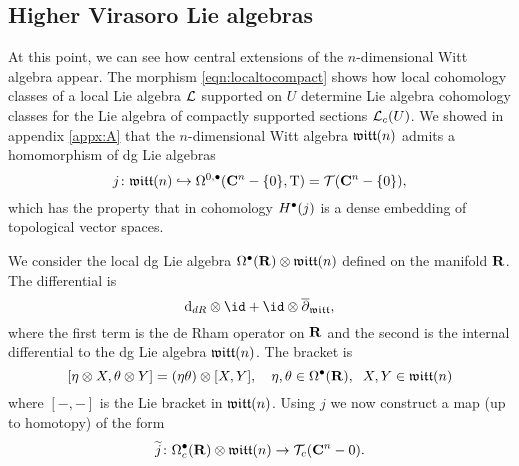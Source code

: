 \documentclass[11pt]{amsart}
\begin{document}
\subsection{Higher Virasoro Lie algebras}

At this point, we can see how central extensions of the $n$-dimensional Witt algebra appear.
The morphism \eqref{eqn:localtocompact} shows how local cohomology classes of a local Lie algebra $\mathcal L$ supported on $U$ determine Lie algebra cohomology classes for the Lie algebra of compactly supported sections $\mathcal L_c(U)$.
We showed in appendix \ref{appx:A} that the $n$-dimensional Witt algebra $\mathfrak{witt}(n)$ admits a homomorphism of dg Lie algebras
\begin{equation}
j \colon \mathfrak{witt}(n) \hookrightarrow \Omega^{0,\bullet} (\mathbf{C}^n - \{0\}, {\rm T}) = \mathcal T(\mathbf{C}^n - \{0\}),
\end{equation}
which has the property that in cohomology $H^\bullet(j)$ is a dense embedding of topological vector spaces.

We consider the local dg Lie algebra $\Omega^\bullet(\mathbf{R}) \otimes \mathfrak{witt}(n)$ defined on the manifold $\mathbf{R}$.
The differential is 
\begin{equation}
\d_{dR} \otimes \id + \id \otimes \dbar_{\lie{witt}},
\end{equation}
where the first term is the de Rham operator on $\mathbf{R}$ and the second is the internal differential to the dg Lie algebra $\mathfrak{witt}(n)$.
The bracket is
\begin{equation}\label{eqn:tensorbracket}
[\eta \otimes X, \theta \otimes Y] = (\eta \theta) \otimes [X,Y] , \quad \eta,\theta \in \Omega^\bullet(\mathbf{R}), \;\; X,Y \in \mathfrak{witt}(n)
\end{equation}
where $[-,-]$ is the Lie bracket in $\mathfrak{witt}(n)$.
Using $j$ we now construct a map (up to homotopy) of the form
\begin{equation}\label{eqn:tilj}
\widetilde j \colon \Omega^\bullet_c (\mathbf{R}) \otimes \mathfrak{witt}(n) \to \mathcal T_c (\mathbf{C}^n - 0) .
\end{equation}
\end{document}
